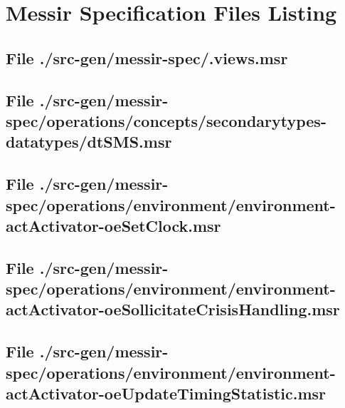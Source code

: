 \chapter{Messir Specification Files Listing}

\section[File /src-gen/messir-spec/.views.msr]{File ./src-gen/messir-spec/.views.msr}
\scriptsize

\normalsize
	
\section[File /src-gen/messir-spec/operations/concepts/secondarytypes-datatypes/dtSMS.msr]{File ./src-gen/messir-spec/operations/concepts/secondarytypes-datatypes/dtSMS.msr}
\scriptsize

\normalsize
	
\section[File /src-gen/messir-spec/operations.../environment-actActivator-oeSetClock.msr]{File ./src-gen/messir-spec/operations/environment/environment-actActivator-oeSetClock.msr}
\scriptsize

\normalsize
	
\section[File /src-gen.../environment-actActivator-oeSollicitateCrisisHandling.msr]{File ./src-gen/messir-spec/operations/environment/environment-actActivator-oeSollicitateCrisisHandling.msr}
\scriptsize

\normalsize
	
\section[File /src-gen.../environment-actActivator-oeUpdateTimingStatistic.msr]{File ./src-gen/messir-spec/operations/environment/environment-actActivator-oeUpdateTimingStatistic.msr}
\scriptsize

\normalsize
	
